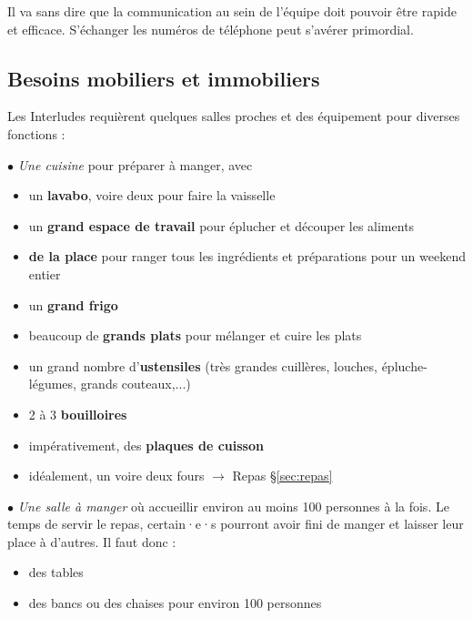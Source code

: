 Il va sans dire que la communication au sein de l'équipe doit pouvoir être rapide et efficace. S'échanger les numéros de téléphone peut s'avérer primordial.

\subsection{Besoins mobiliers et immobiliers}

Les Interludes requièrent quelques salles proches et des équipement pour diverses fonctions :

$\bullet$ \emph{Une cuisine} pour préparer à manger, avec
\begin{itemize}
    \item un \textbf{lavabo}, voire deux pour faire la vaisselle
    \item un \textbf{grand espace de travail} pour éplucher et découper les aliments
    \item \textbf{de la place} pour ranger tous les ingrédients et préparations pour un weekend entier
    \item un \textbf{grand frigo}
    \item beaucoup de \textbf{grands plats} pour mélanger et cuire les plats
    \item un grand nombre d'\textbf{ustensiles} (très grandes cuillères, louches, épluche-légumes, grands couteaux,...)
    \item 2 à 3 \textbf{bouilloires}
    \item impérativement, des \textbf{plaques de cuisson}
    \item idéalement, un voire deux fours $\to$ Repas \S\ref{sec:repas}
\end{itemize}

$\bullet$ \emph{Une salle à manger} où accueillir environ au moins 100 personnes à la fois. Le temps de servir le repas, certain·e·s pourront avoir fini de manger et laisser leur place à d'autres. Il faut donc :
\begin{itemize}
    \item des tables
    \item des bancs ou des chaises pour environ 100 personnes
\end{itemize}

